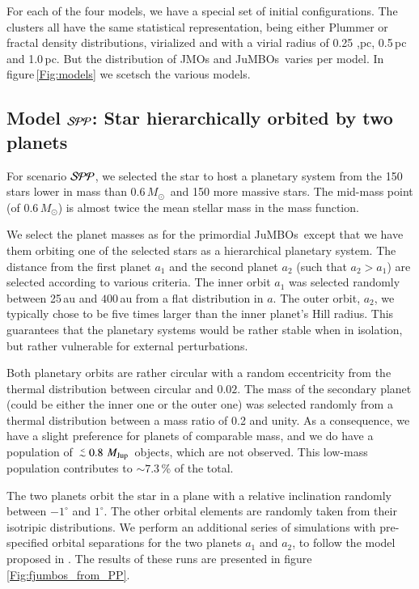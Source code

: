 \documentclass[submission,phys]{lib/SciPost}
\newcommand{\MSun}{\mbox{${M}_\odot$}}
\newcommand{\MJup}{\mbox{${M}_{\rm Jup}$}}
\def\aplt{\ {\raise-.5ex\hbox{$\buildrel<\over\sim$}}\ }
\newcommand{\jumbos}{\mbox{JuMBOs}}
\begin{document}
For each of the four models, we have a special set of initial
configurations. The clusters all have the same statistical
representation, being either Plummer or fractal density distributions,
virialized and with a virial radius of 0.25 ,pc, 0.5\,pc and
1.0\,pc. But the distribution of JMOs and \jumbos\, varies per model.
In figure\,\ref{Fig:models} we scetsch the various models.

\subsection{Model ${\cal SPP}$: Star hierarchically orbited by two planets}

For scenario ${\cal SPP}$, we selected the star to host a
planetary system from the 150 stars lower in mass than 0.6\,\MSun\,
and 150 more massive stars. The mid-mass point (of 0.6\,\MSun) is
almost twice the mean stellar mass in the mass function.

We select the planet masses as for the primordial \jumbos\, except
that we have them orbiting one of the selected stars as a hierarchical
planetary system. The distance from the first planet $a_1$ and the
second planet $a_2$ (such that $a_2>a_1$) are selected according to
various criteria.  The inner orbit $a_1$ was selected randomly between
25\,au and $400$\,au from a flat distribution in $a$.  The outer
orbit, $a_2$, we typically chose to be five times larger than the
inner planet's Hill radius.  This guarantees that the planetary
systems would be rather stable when in isolation, but rather
vulnerable for external perturbations.

Both planetary orbits are rather circular with a random eccentricity
from the thermal distribution between circular and $0.02$.  The mass
of the secondary planet (could be either the inner one or the outer
one) was selected randomly from a thermal distribution between a mass
ratio of 0.2 and unity. As a consequence, we have a slight preference
for planets of comparable mass, and we do have a population of $\aplt
0.8$\,\MJup\, objects, which are not observed.  This low-mass
population contributes to $\sim 7.3$\,\% of the total.

The two planets orbit the star in a plane with a relative inclination
randomly between $-1^\circ$ and $1^\circ$. The other orbital elements
are randomly taken from their isotripic distributions.  We perform an
additional series of simulations with pre-specified orbital
separations for the two planets $a_1$ and $a_2$, to follow the model
proposed in \cite{2023arXiv231006016W}. The results of these runs are
presented in figure\,\ref{Fig:fjumbos_from_PP}.
\end{document}
